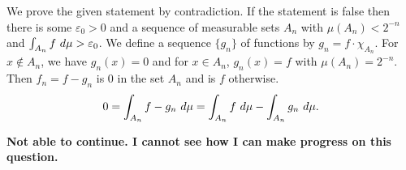 \documentclass[12pt]{article}
\begin{document}
\begin{enumerate}
    \begin{mybox}
        We prove the given statement by contradiction. If the statement is
        false then there is some
        $\varepsilon_0>0$ and a sequence of measurable sets $A_n$ with
        $\mu(A_n)<2^{-n}$ and $\int_{A_n}{f \ d\mu}>\varepsilon_0$. We define a
        sequence $\{g_n\}$ of functions by $g_n=f\cdot\chi_{A_n}$. For
        $x\notin A_n$, we have $g_n(x)=0$ and for $x\in A_n$,
        $g_n(x)=f$ with $\mu(A_n)=2^{-n}$. Then $f_n=f-g_n$ is 0 in the
        set $A_n$ and is $f$ otherwise.
        $$
        0=\int_{A_n}{f-g_n \ d\mu}=\int_{A_n}{f\ d\mu}-
        \int_{A_n}{g_n\ d\mu}.$$
        
        \textbf{Not able to continue. I cannot see how I can make progress on this
        question.}
    \end{mybox}
\end{enumerate}
\end{document}
